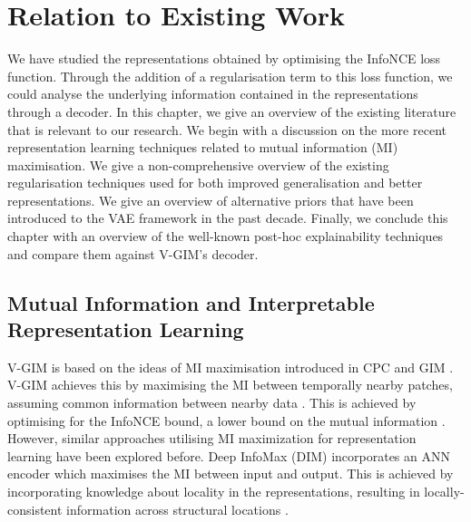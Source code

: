 \chapter{Relation to Existing Work} \label{cha:5}
We have studied the representations obtained by optimising the InfoNCE loss function. Through the addition of a regularisation term to this loss function, we could analyse the underlying information contained in the representations through a decoder. In this chapter, we give an overview of the existing literature that is relevant to our research. We begin with a discussion on the more recent representation learning techniques related to mutual information (MI) maximisation. We give a non-comprehensive overview of the existing regularisation techniques used for both improved generalisation and better representations. We give an overview of alternative priors that have been introduced to the VAE framework in the past decade. Finally, we conclude this chapter with an overview of the well-known post-hoc explainability techniques and compare them against V-GIM's decoder.




\section{Mutual Information and Interpretable Representation Learning}
	V-GIM is based on the ideas of MI maximisation introduced in CPC and GIM \citep{lowePuttingEndEndtoEnd2020a, oordRepresentationLearningContrastive2019}. V-GIM achieves this by maximising the MI between temporally nearby patches, assuming common information between nearby data \citep{lowePuttingEndEndtoEnd2020a}. This is achieved by optimising for the InfoNCE bound, a lower bound on the mutual information \cite{oordRepresentationLearningContrastive2019}. However, similar approaches utilising MI maximization for representation learning have been explored before. Deep InfoMax (DIM) incorporates an ANN encoder which maximises the MI between input and output. This is achieved by incorporating knowledge about locality in the representations, resulting in locally-consistent information across structural locations \citep{hjelmLearningDeepRepresentations2019}. 
	
